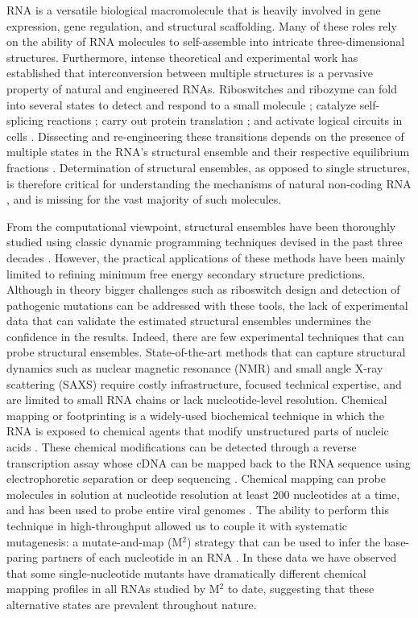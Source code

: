 \documentclass[12pt]{article}
\begin{document}
RNA is a versatile biological macromolecule that is heavily involved in gene expression, gene regulation, and structural scaffolding.
Many of these roles rely on the ability of RNA molecules to self-assemble into intricate three-dimensional structures. 
Furthermore, intense theoretical and experimental work has established that interconversion between multiple structures is a pervasive property of natural and engineered RNAs. 
Riboswitches and ribozyme can fold into several states to detect and respond to a small molecule  \cite{Mandal2004,Winkler2003}; catalyze self-splicing reactions \cite{Cate1996,Kennedy2013,Soukup1999}; carry out protein translation \cite{Ban2000,Nissen2000, Muth2000}; and activate logical circuits in cells \cite{Win2008,Lucks2008}. 
Dissecting and re-engineering these transitions depends on the presence of multiple states in the RNA's structural ensemble and their respective equilibrium fractions \cite{Reining2013}. 
Determination of structural ensembles, as opposed to single structures, is therefore critical for understanding the mechanisms of natural non-coding RNA \cite{Reining2013,Villordo2010}, and is missing for the vast majority of such molecules.  

From the computational viewpoint, structural ensembles have been thoroughly studied using classic dynamic programming techniques devised in the past three decades \cite{McCaskill,Ding2005b}. 
However, the practical applications of  these methods have been mainly limited to refining minimum free energy secondary structure predictions. 
Although in theory bigger challenges such as riboswitch design and detection of pathogenic mutations can be addressed with these tools, the lack of experimental data that can validate the estimated structural ensembles undermines the confidence in the results. 
Indeed, there are few experimental techniques that can probe structural ensembles. 
State-of-the-art methods that can capture structural dynamics such as nuclear magnetic resonance (NMR) \cite{Bothe2011} and small angle X-ray scattering (SAXS) \cite{Russell2002,Wang2009} require costly infrastructure, focused technical expertise, and are limited to small RNA chains or lack nucleotide-level resolution. 
Chemical mapping or footprinting is a widely-used biochemical technique in which the RNA is exposed to chemical agents that modify unstructured parts of nucleic acids \cite{Mortimer2007,Tijerina2007}. 
These chemical modifications can be detected through a reverse transcription assay whose cDNA can be mapped back to the RNA sequence using electrophoretic separation or deep sequencing \cite{Mitra2008,Lucks2011}. 
Chemical mapping can probe molecules in solution at nucleotide resolution at least 200 nucleotides at a time, and has been used to probe entire viral genomes \cite{Wilkinson2008,Watts2009}. 
The ability to perform this technique in high-throughput allowed us to couple it with systematic mutagenesis: a mutate-and-map (M$^2$) strategy that can be used to infer the base-paring partners of each nucleotide in an RNA \cite{Kladwang2011,Kladwang2011f}. 
In these data we have observed that some single-nucleotide mutants have dramatically different chemical mapping profiles in all RNAs studied by M$^2$ to date, suggesting that these alternative states are prevalent throughout nature.
\end{document}
